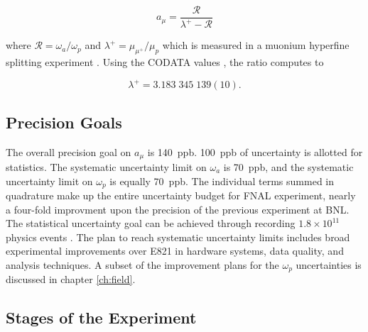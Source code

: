 \begin{equation}
\label{eqn:g-2-result-2}
a_\mu = \frac{\mathcal{R}}{\lambda^+ - \mathcal{R}}
\end{equation}

where $\mathcal{R} = \omega_a / \omega_p$ and $\lambda^+ = \mu_{\mu^+} / \mu_p$  which is measured in a muonium hyperfine splitting experiment \cite{muonium-hyperfine}.  Using the CODATA values \cite{codata}, the ratio computes to

\begin{equation}
\label{eqn:muon-to-proton-mu-ratio}
\lambda^+ = 3.183\;345\;139(10).
\end{equation}




\subsection{Precision Goals}

The overall precision goal on $a_\mu$ is \SI{140}{ppb}.  \SI{100}{ppb} of uncertainty is allotted for statistics.  The systematic uncertainty limit on $\omega_a$ is \SI{70}{ppb}, and the systematic uncertainty limit on $\omega_p$ is equally \SI{70}{ppb}.  The individual terms summed in quadrature make up the entire uncertainty budget for FNAL \mugmtwo experiment, nearly a four-fold improvment upon the precision of the previous experiment at BNL.  The statistical uncertainty goal can be achieved through recording $1.8\times10^{11}$ physics events \cite{e989-tdr}.  The plan to reach systematic uncertainty limits includes broad experimental improvements over E821 in hardware systems, data quality, and analysis techniques.  A subset of the improvement plans for the $\omega_p$ uncertainties is discussed in chapter \ref{ch:field}.

\subsection{Stages of the Experiment}

